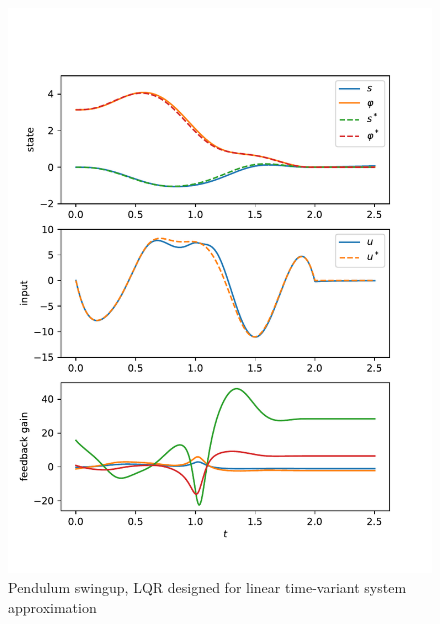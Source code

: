 \documentclass[a4paper,11pt,headinclude=true,headsepline,parskip=half,DIV=13]{scrartcl}
\begin{document}
\begin{figure}[ht]
    \centering
    \includegraphics[scale=1]{img/pendulum_ltv.pdf}
    \caption{Pendulum swingup, LQR designed for linear time-variant system approximation}
    \label{fig:pendulum_ltv}
\end{figure}

\printglossaries
\end{document}
